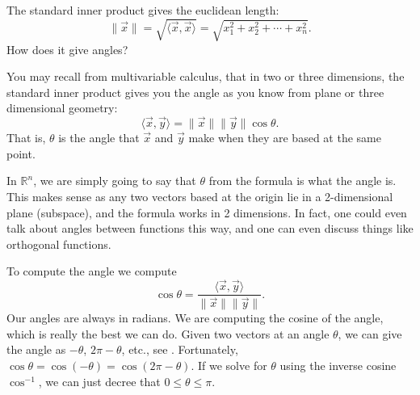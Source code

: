 \documentclass{ximera}
\begin{document}
The standard inner product gives the euclidean length:
\begin{equation*}
    \lVert{\vec{x}}\rVert = \sqrt{\langle \vec{x}, \vec{x} \rangle} = \sqrt{x_1^2 + x_2^2 + \cdots + x_n^2} .
\end{equation*}
How does it give angles?

You may recall from multivariable calculus, that in two or three dimensions, the standard inner product gives you the angle as you know from plane or three dimensional geometry:
\begin{equation*}
    \langle \vec{x}, \vec{y} \rangle = \lVert{\vec{x}}\rVert \lVert{\vec{y}}\rVert \cos \theta.
\end{equation*}
That is, $\theta$ is the angle that $\vec{x}$ and $\vec{y}$ make when they are based at the same point.

In ${\mathbb{R}}^n$, we are simply going to say that $\theta$ from the formula is what the angle is. This makes sense as any two vectors based at the origin lie in a 2-dimensional plane (subspace), and the formula works in 2 dimensions. In fact, one could even talk about angles between functions this way, and one can even discuss things like orthogonal functions.%

%

To compute the angle we compute
\begin{equation*}
    \cos \theta = \frac{\langle \vec{x}, \vec{y} \rangle}{\lVert{\vec{x}}\rVert \lVert{\vec{y}}\rVert} .
\end{equation*}
Our angles are always in radians. We are computing the cosine of the angle, which is really the best we can do.  Given two vectors at an angle $\theta$, we can give the angle as $-\theta$, $2\pi-\theta$, etc., see . Fortunately, $\cos \theta = \cos (-\theta) = \cos(2\pi - \theta)$. If we solve for $\theta$ using the inverse cosine $\cos^{-1}$, we can just decree that $0 \leq \theta \leq \pi$.
\end{document}
